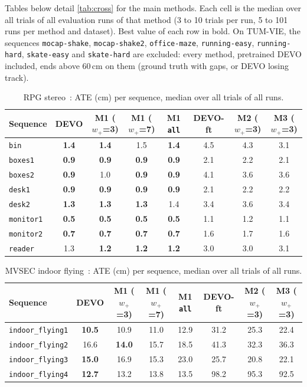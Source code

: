 \documentclass[conference]{IEEEtran}
\newcommand{\best}[1]{\textbf{#1}}
\newcommand{\code}[1]{\texttt{#1}}
\newcommand{\wplus}{w_{+}}
\begin{document}
Tables below detail \cref{tab:cross} for the main methods. Each cell is the median over all
trials of all evaluation runs of that method (3 to 10 trials per run, 5 to 101 runs per
method and dataset). Best value of each row in bold. On TUM-VIE, the sequences
\code{mocap-shake}, \code{mocap-shake2}, \code{office-maze}, \code{running-easy},
\code{running-hard}, \code{skate-easy} and \code{skate-hard} are excluded: every method,
pretrained DEVO included, ends above 60\,cm on them (ground truth with gaps, or DEVO losing
track).

\newcommand{\crosshead}{Sequence & DEVO & M1 ($\wplus$=3) & M1 ($\wplus$=7) & M1 \code{all} & DEVO-ft & M2 ($\wplus$=3) & M3 ($\wplus$=3) \\}

\begin{table}[H]
\centering
\caption{RPG stereo~\cite{zhou2018semidense}: ATE (cm) per sequence, median over all
trials of all runs.}
\begin{tabular}{lccccccc}
\toprule
\crosshead
\midrule
\code{bin} & \best{1.4} & \best{1.4} & 1.5 & \best{1.4} & 4.5 & 4.3 & 3.1 \\
\code{boxes1} & \best{0.9} & \best{0.9} & \best{0.9} & \best{0.9} & 2.1 & 2.2 & 2.1 \\
\code{boxes2} & \best{0.9} & 1.0 & \best{0.9} & \best{0.9} & 4.1 & 3.6 & 3.6 \\
\code{desk1} & \best{0.9} & \best{0.9} & \best{0.9} & \best{0.9} & 2.1 & 2.2 & 2.2 \\
\code{desk2} & \best{1.3} & \best{1.3} & \best{1.3} & 1.4 & 3.4 & 3.6 & 3.4 \\
\code{monitor1} & \best{0.5} & \best{0.5} & \best{0.5} & \best{0.5} & 1.1 & 1.2 & 1.1 \\
\code{monitor2} & \best{0.7} & \best{0.7} & \best{0.7} & \best{0.7} & 1.6 & 1.7 & 1.6 \\
\code{reader} & 1.3 & \best{1.2} & \best{1.2} & \best{1.2} & 3.0 & 3.0 & 3.1 \\
\bottomrule
\end{tabular}
\end{table}

\begin{table}[H]
\centering
\caption{MVSEC indoor flying~\cite{zhu2018mvsec}: ATE (cm) per sequence, median over all
trials of all runs.}
\begin{tabular}{lccccccc}
\toprule
\crosshead
\midrule
\code{indoor\_flying1} & \best{10.5} & 10.9 & 11.0 & 12.9 & 31.2 & 25.3 & 22.4 \\
\code{indoor\_flying2} & 16.6 & \best{14.0} & 15.7 & 18.5 & 41.3 & 32.3 & 36.3 \\
\code{indoor\_flying3} & \best{15.0} & 16.9 & 15.3 & 23.0 & 25.7 & 20.8 & 22.1 \\
\code{indoor\_flying4} & \best{12.7} & 13.2 & 13.8 & 13.5 & 98.2 & 95.3 & 92.5 \\
\bottomrule
\end{tabular}
\end{table}
\end{document}
